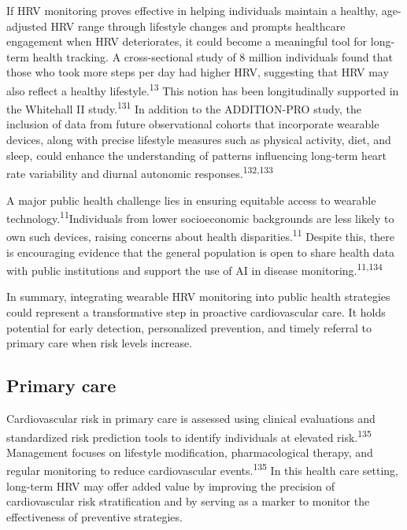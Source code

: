 \documentclass[
  a4paper,
  headsepline=true,
  open=any]{scrbook}
\begin{document}
If HRV monitoring proves effective in helping individuals maintain a
healthy, age-adjusted HRV range through lifestyle changes and prompts
healthcare engagement when HRV deteriorates, it could become a
meaningful tool for long-term health tracking. A cross-sectional study
of 8 million individuals found that those who took more steps per day
had higher HRV, suggesting that HRV may also reflect a healthy
lifestyle.\textsuperscript{13} This notion has been longitudinally
supported in the Whitehall II study.\textsuperscript{131} In addition to
the ADDITION-PRO study, the inclusion of data from future observational
cohorts that incorporate wearable devices, along with precise lifestyle
measures such as physical activity, diet, and sleep, could enhance the
understanding of patterns influencing long-term heart rate variability
and diurnal autonomic responses.\textsuperscript{132,133}

A major public health challenge lies in ensuring equitable access to
wearable technology.\textsuperscript{11}Individuals from lower
socioeconomic backgrounds are less likely to own such devices, raising
concerns about health disparities.\textsuperscript{11} Despite this,
there is encouraging evidence that the general population is open to
share health data with public institutions and support the use of AI in
disease monitoring.\textsuperscript{11,134}

In summary, integrating wearable HRV monitoring into public health
strategies could represent a transformative step in proactive
cardiovascular care. It holds potential for early detection,
personalized prevention, and timely referral to primary care when risk
levels increase.

\hypertarget{primary-care}{%
\subsection{Primary care}\label{primary-care}}

Cardiovascular risk in primary care is assessed using clinical
evaluations and standardized risk prediction tools to identify
individuals at elevated risk.\textsuperscript{135} Management focuses on
lifestyle modification, pharmacological therapy, and regular monitoring
to reduce cardiovascular events.\textsuperscript{135} In this health
care setting, long-term HRV may offer added value by improving the
precision of cardiovascular risk stratification and by serving as a
marker to monitor the effectiveness of preventive strategies.
\end{document}

